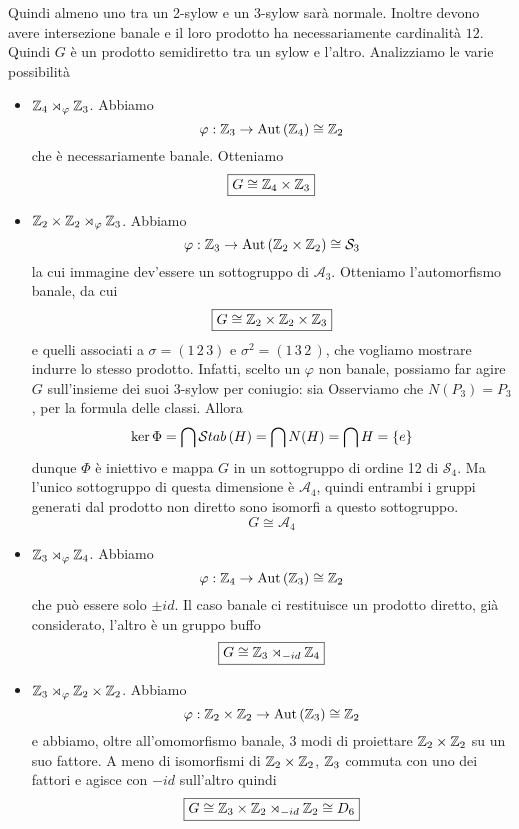 \begin{multicols}{2}
Quindi almeno uno tra un 2-sylow e un 3-sylow sarà normale. Inoltre devono avere intersezione banale e il loro prodotto ha necessariamente cardinalità $ 12 $. Quindi $ G $ è un prodotto semidiretto tra un sylow e l'altro. Analizziamo le varie possibilità

\begin{itemize}
	\item $ \mathbb{Z}_4 \rtimes_\varphi \mathbb{Z}_3 $. Abbiamo
	\[ \varphi : \mathbb{Z}_3 \to \mathrm{Aut}\left( \mathbb{Z}_4 \right) \cong \mathbb{Z}_2 \]
	che è necessariamente banale. Otteniamo
	\[ \boxed{G \cong \mathbb{Z}_4 \times \mathbb{Z}_3} \]
	\item $ \mathbb{Z}_2 \times \mathbb{Z}_2 \rtimes_\varphi \mathbb{Z}_3 $. Abbiamo
	\[ \varphi : \mathbb{Z}_3 \to \mathrm{Aut}\left( \mathbb{Z}_2\times\mathbb{Z}_2 \right) \cong \mathcal{S}_3 \]
	la cui immagine dev'essere un sottogruppo di $ \mathcal{A}_3 $. Otteniamo l'automorfismo banale, da cui
	\[  \boxed{G \cong \mathbb{Z}_2 \times \mathbb{Z}_2 \times \mathbb{Z}_3} \]
	e quelli associati a $ \sigma = (1\,2\,3) $ e $ \sigma^2 = (1\,3\,2\,) $, che vogliamo mostrare indurre lo stesso prodotto. Infatti, scelto un $ \varphi $ non banale, possiamo far agire $ G $ sull'insieme dei suoi 3-sylow per coniugio: sia 
	Osserviamo che $ N(P_3) = P_3 $, per la formula delle classi. Allora $$  \ker\Phi = \bigcap \mathcal{S}tab\left( H \right) = \bigcap N(H) = \bigcap H = \{ e \}  $$ dunque $ \Phi $ è iniettivo e mappa $ G $ in un sottogruppo di ordine 12 di $ \mathcal{S}_4 $. Ma l'unico sottogruppo di questa dimensione è $ \mathcal{A}_4 $, quindi entrambi i gruppi generati dal prodotto non diretto sono isomorfi a questo sottogruppo.
	\[ \boxed{G \cong \mathcal{A}_4} \]
	\item $ \mathbb{Z}_3 \rtimes_\varphi \mathbb{Z}_4 $. Abbiamo
	\[ \varphi : \mathbb{Z}_4 \to \mathrm{Aut}\left( \mathbb{Z}_3 \right) \cong \mathbb{Z}_2 \]
	che può essere solo $ \pm id $. Il caso banale ci restituisce un prodotto diretto, già considerato, l'altro è un gruppo buffo
	\[ \boxed{G \cong \mathbb{Z}_3 \rtimes_{-id} \mathbb{Z}_4} \]
	\item $ \mathbb{Z}_3 \rtimes_\varphi \mathbb{Z}_2 \times \mathbb{Z}_2  $. Abbiamo
	\[ \varphi : \mathbb{Z}_2 \times \mathbb{Z}_2  \to \mathrm{Aut}\left( \mathbb{Z}_3 \right) \cong \mathbb{Z}_2 \]
	e abbiamo, oltre all'omomorfismo banale, 3 modi di proiettare $ \mathbb{Z}_2 \times \mathbb{Z}_2  $ su un suo fattore. A meno di isomorfismi di $ \mathbb{Z}_2 \times \mathbb{Z}_2  $, $ \mathbb{Z}_3 $ commuta con uno dei fattori e agisce con $ -id $ sull'altro quindi
	\[ \boxed{G \cong \mathbb{Z}_3\times \mathbb{Z}_2 \rtimes_{-id} \mathbb{Z}_2 \cong D_6} \]
\end{itemize}




\end{multicols}

